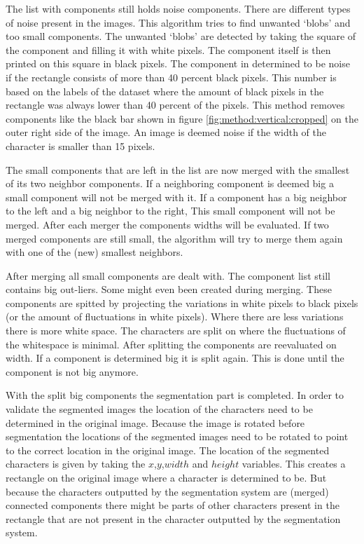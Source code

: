 The list with components still holds noise components. There are different types of noise present in the images. This algorithm tries to find unwanted `blobs' and too small components. The unwanted `blobs' are detected by taking the square of the component and filling it with white pixels. The component itself is then printed on this square in black pixels. The component in determined to be noise if the rectangle consists of more than 40 percent black pixels. This number is based on the labels of the dataset where the amount of black pixels in the rectangle was always lower than 40 percent of the pixels. This method removes components like the black bar shown in figure \ref{fig:method:vertical:cropped} on the outer right side of the image. An image is deemed noise if the width of the character is smaller than 15 pixels. 

The small components that are left in the list are now merged with the smallest of its two neighbor components. If a neighboring component is deemed big a small component will not be merged with it. If a component has a big neighbor to the left and a big neighbor to the right, This small component will not be merged. After each merger the components widths will be evaluated. If two merged components are still small, the algorithm will try to merge them again with one of the (new) smallest neighbors.

After merging all small components are dealt with. The component list still contains big out-liers. Some might even been created during merging. These components are spitted by projecting the variations in white pixels to black pixels (or the amount of fluctuations in white pixels). Where there are less variations there is more white space. The characters are split on where the fluctuations of the whitespace is minimal. After splitting the components are reevaluated on width. If a component is determined big it is split again. This is done until the component is not big anymore.


With the split big components the segmentation part is completed. In order to validate the segmented images the location of the characters need to be determined in the original image. Because the image is rotated before segmentation the locations of the segmented images need to be rotated to point to the correct location in the original image. The location of the segmented characters is given by taking the $x$,$y$,$width$ and $height$ variables. This creates a rectangle on the original image where a character is determined to be. But because the characters outputted by the segmentation system are (merged) connected components there might be parts of other characters present in the rectangle that are not present in the character outputted by the segmentation system.

